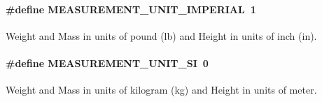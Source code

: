 \paragraph[{\texorpdfstring{M\+E\+A\+S\+U\+R\+E\+M\+E\+N\+T\+\_\+\+U\+N\+I\+T\+\_\+\+I\+M\+P\+E\+R\+I\+AL}{MEASUREMENT_UNIT_IMPERIAL}}]{\setlength{\rightskip}{0pt plus 5cm}\#define M\+E\+A\+S\+U\+R\+E\+M\+E\+N\+T\+\_\+\+U\+N\+I\+T\+\_\+\+I\+M\+P\+E\+R\+I\+AL~1}\hypertarget{group___m_e_a_s_u_r_e_m_e_n_t___u_n_i_t_ga72462eb05ffde798eefa45461b450c1a}{}\label{group___m_e_a_s_u_r_e_m_e_n_t___u_n_i_t_ga72462eb05ffde798eefa45461b450c1a}
Weight and Mass in units of pound (lb) and Height in units of inch (in). 
\paragraph[{\texorpdfstring{M\+E\+A\+S\+U\+R\+E\+M\+E\+N\+T\+\_\+\+U\+N\+I\+T\+\_\+\+SI}{MEASUREMENT_UNIT_SI}}]{\setlength{\rightskip}{0pt plus 5cm}\#define M\+E\+A\+S\+U\+R\+E\+M\+E\+N\+T\+\_\+\+U\+N\+I\+T\+\_\+\+SI~0}\hypertarget{group___m_e_a_s_u_r_e_m_e_n_t___u_n_i_t_gac2b9f61a47ad7ec7ab3f7291df1f992c}{}\label{group___m_e_a_s_u_r_e_m_e_n_t___u_n_i_t_gac2b9f61a47ad7ec7ab3f7291df1f992c}
Weight and Mass in units of kilogram (kg) and Height in units of meter. 